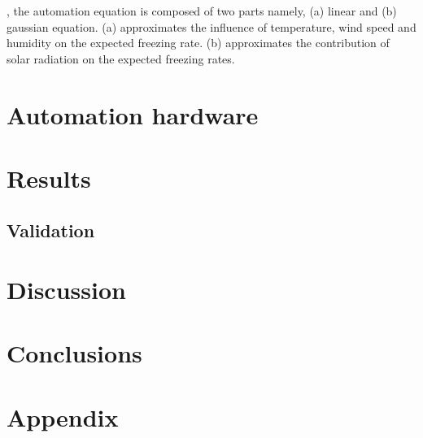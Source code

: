 \documentclass[utf8]{frontiersSCNS}
\begin{document}
, the automation equation is composed of two parts namely, (a) linear and (b) gaussian equation. (a)
approximates the influence of temperature, wind speed and humidity on the expected freezing rate. (b)
approximates the contribution of solar radiation on the expected freezing rates.

\section{Automation hardware}

\section{Results}


\subsection{Validation}

\section{Discussion}

\section{Conclusions}

\section{Appendix}

 
\end{document}
